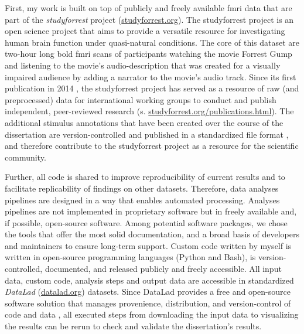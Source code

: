 First, my work is built on top of publicly and freely available \ac{fmri} data
that are part of the \textit{studyforrest} project
(\href{www.studyforrest.org}{\url{studyforrest.org}}).
%
The studyforrest project is an open science project that aims to provide a
versatile resource for investigating human brain function under quasi-natural
conditions.
The core of this dataset are two-hour long \ac{bold} \ac{fmri} scans of
participants watching the movie Forrest Gump \citep{ForrestGumpMovie} and
listening to the movie's audio-description that was created for a visually
impaired audience by adding a narrator to the movie's audio track.
Since its first publication in 2014 \citep{hanke2014audiomovie}, the
studyforrest project has served as a resource of raw (and preprocessed) data for
international working groups to conduct and publish independent, peer-reviewed
research (s.
\href{www.studyforrest.org/publications.html}{\url{studyforrest.org/publications.html}}).
The additional stimulus annotations that have been created over the course of
the dissertation are version-controlled and published in a standardized file
format \citep{haeusler2021speechanno}, and therefore contribute to the
studyforrest project as a resource for the scientific community.

Further, all code is shared to improve reproducibility of current results and to
facilitate replicability of findings on other datasets.
Therefore, data analyses pipelines are designed in a way that enables automated
processing.
Analyses pipelines are not implemented in proprietary software but in freely
available and, if possible, open-source software.
Among potential software packages, we chose the tools that offer the most solid
documentation, and a broad basis of developers and maintainers to ensure
long-term support.
Custom code written by myself is written in open-source programming languages
(Python and Bash), is version-controlled, documented, and released publicly and
freely accessible.
All input data, custom code, analysis steps and output data are accessible in
standardized \textit{DataLad} (\href{www.datalad.org}{datalad.org}) datasets.
Since DataLad provides a free and open-source software solution that manages
provenience, distribution, and version-control of code and data
\citep{halchenko2021datalad}, all executed steps from downloading the input data
to visualizing the results can be rerun to check and validate the dissertation's
results.

